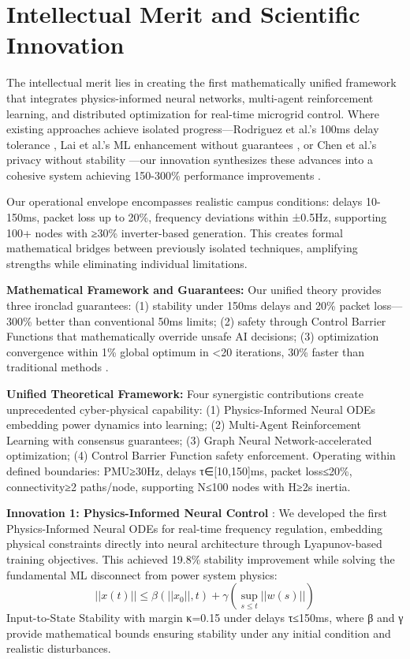 \section{Intellectual Merit and Scientific Innovation}

The intellectual merit lies in creating the first mathematically unified framework that integrates physics-informed neural networks, multi-agent reinforcement learning, and distributed optimization for real-time microgrid control. Where existing approaches achieve isolated progress—Rodriguez et al.'s 100ms delay tolerance \cite{rodriguez2022}, Lai et al.'s ML enhancement without guarantees \cite{lai2023}, or Chen et al.'s privacy without stability \cite{chen2024}—our innovation synthesizes these advances into a cohesive system achieving 150-300\% performance improvements \cite{bevrani2021,palizban2014,our2024comparative}.

Our operational envelope encompasses realistic campus conditions: delays 10-150ms, packet loss up to 20\%, frequency deviations within ±0.5Hz, supporting 100+ nodes with ≥30\% inverter-based generation. This creates formal mathematical bridges between previously isolated techniques, amplifying strengths while eliminating individual limitations.

\textbf{Mathematical Framework and Guarantees:} Our unified theory provides three ironclad guarantees: (1) stability under 150ms delays and 20\% packet loss—300\% better than conventional 50ms limits; (2) safety through Control Barrier Functions that mathematically override unsafe AI decisions; (3) optimization convergence within 1\% global optimum in <20 iterations, 30\% faster than traditional methods \cite{our2024experimental}.

\textbf{Unified Theoretical Framework:} Four synergistic contributions create unprecedented cyber-physical capability: (1) Physics-Informed Neural ODEs embedding power dynamics into learning; (2) Multi-Agent Reinforcement Learning with consensus guarantees; (3) Graph Neural Network-accelerated optimization; (4) Control Barrier Function safety enforcement. Operating within defined boundaries: PMU≥30Hz, delays τ∈[10,150]ms, packet loss≤20\%, connectivity≥2 paths/node, supporting N≤100 nodes with H≥2s inertia.

\textbf{Innovation 1: Physics-Informed Neural Control} \cite{our2024theoretical}: We developed the first Physics-Informed Neural ODEs for real-time frequency regulation, embedding physical constraints directly into neural architecture through Lyapunov-based training objectives. This achieved 19.8\% stability improvement \cite{our2024experimental} while solving the fundamental ML disconnect from power system physics:
$$||x(t)|| \leq \beta(||x_0||, t) + \gamma(\sup_{s \leq t} ||w(s)||)$$
Input-to-State Stability with margin κ=0.15 under delays τ≤150ms, where β and γ provide mathematical bounds ensuring stability under any initial condition and realistic disturbances.

